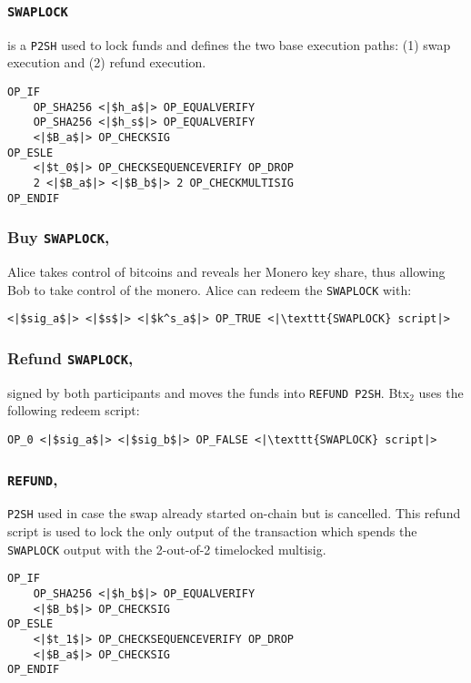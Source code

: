 \documentclass{llncs}
\begin{document}
\subsubsection{\texttt{SWAPLOCK}}
is a \texttt{P2SH} used to lock funds and defines the two base execution paths: (1) swap execution and (2) refund execution.

\begin{verbatim}
OP_IF
    OP_SHA256 <|$h_a$|> OP_EQUALVERIFY
    OP_SHA256 <|$h_s$|> OP_EQUALVERIFY
    <|$B_a$|> OP_CHECKSIG
OP_ESLE
    <|$t_0$|> OP_CHECKSEQUENCEVERIFY OP_DROP
    2 <|$B_a$|> <|$B_b$|> 2 OP_CHECKMULTISIG
OP_ENDIF
\end{verbatim}

\subsubsection{Buy \texttt{SWAPLOCK},}
Alice takes control of bitcoins and reveals her Monero key share, thus allowing Bob to take control of the monero. Alice can redeem the \texttt{SWAPLOCK} with:

\begin{verbatim}
<|$sig_a$|> <|$s$|> <|$k^s_a$|> OP_TRUE <|\texttt{SWAPLOCK} script|>
\end{verbatim}

\subsubsection{Refund \texttt{SWAPLOCK},}
signed by both participants and moves the funds into \texttt{REFUND P2SH}. Btx$_2$ uses the following redeem script:

\begin{verbatim}
OP_0 <|$sig_a$|> <|$sig_b$|> OP_FALSE <|\texttt{SWAPLOCK} script|>
\end{verbatim}

\subsubsection{\texttt{REFUND},}
\texttt{P2SH} used in case the swap already started on-chain but is cancelled. This refund script is used to lock the only output of the transaction which spends the \texttt{SWAPLOCK} output with the 2-out-of-2 timelocked multisig.

\begin{verbatim}
OP_IF
    OP_SHA256 <|$h_b$|> OP_EQUALVERIFY
    <|$B_b$|> OP_CHECKSIG
OP_ESLE
    <|$t_1$|> OP_CHECKSEQUENCEVERIFY OP_DROP
    <|$B_a$|> OP_CHECKSIG
OP_ENDIF
\end{verbatim}
\end{document}
